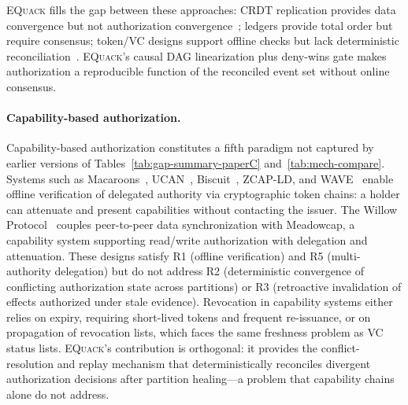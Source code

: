 \documentclass[10pt,journal,compsoc]{IEEEtran}
\newcommand{\equack}{\textsc{EQuack}}
\begin{document}
\equack{} fills the gap between these approaches: CRDT replication provides data convergence but not authorization convergence~\cite{shapiro2011crdt,gomes2017_sec}; ledgers provide total order but require consensus; token/VC designs support offline checks but lack deterministic reconciliation~\cite{rouhani2021distributed}. \equack{}'s causal DAG linearization plus deny-wins gate makes authorization a reproducible function of the reconciled event set without online consensus.

\paragraph{Capability-based authorization.}
Capability-based authorization constitutes a fifth paradigm not captured by earlier versions of Tables~\ref{tab:gap-summary-paperC} and~\ref{tab:mech-compare}. Systems such as Macaroons~\cite{birgisson2014macaroons}, UCAN~\cite{ucan2022}, Biscuit~\cite{biscuit2023}, ZCAP-LD, and WAVE~\cite{andersen2019wave} enable offline verification of delegated authority via cryptographic token chains: a holder can attenuate and present capabilities without contacting the issuer. The Willow Protocol~\cite{willow2024} couples peer-to-peer data synchronization with Meadowcap, a capability system supporting read/write authorization with delegation and attenuation. These designs satisfy R1 (offline verification) and R5 (multi-authority delegation) but do not address R2 (deterministic convergence of conflicting authorization state across partitions) or R3 (retroactive invalidation of effects authorized under stale evidence). Revocation in capability systems either relies on expiry, requiring short-lived tokens and frequent re-issuance, or on propagation of revocation lists, which faces the same freshness problem as VC status lists. \equack{}'s contribution is orthogonal: it provides the conflict-resolution and replay mechanism that deterministically reconciles divergent authorization decisions after partition healing---a problem that capability chains alone do not address.
\end{document}
